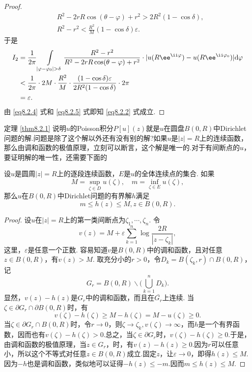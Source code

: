 \begin{proof}
\begin{align*}
&R^2-2rR\cos(\theta-\varphi)+r^2>2R^2(1-\cos\delta),\\
&R^2-r^2<\frac{R^2}M(1-\cos\delta)\varepsilon.
\end{align*}
于是
\begin{equation}\label{eq8.2.5}
\begin{aligned}
I_2&=\frac1{2\pi}\int\limits_{|\varphi-\varphi_0|>\delta}\frac{R^2-r^2}{R^2-2rR
\cos(\theta-\varphi)+r^2}\cdot|u(R\ee^{\ii\varphi})-u(R\ee^{\ii\varphi_0})|\textrm d\varphi\\
&<\frac1{2\pi}\cdot2M\cdot\frac{R^2}M\cdot\frac{(1-\cos\delta)\varepsilon}
{2R^2(1-\cos\delta)}\cdot2\pi\\
&=\varepsilon.
\end{aligned}
\end{equation}
由 \eqref{eq8.2.4} 式和 \eqref{eq8.2.5} 式即知 \eqref{eq8.2.2} 式成立.
\end{proof}

定理 \ref{thm8.2.1} 说明$u$的Poisson积分$P[u](z)$就是$u$在圆盘$B(0,R)$中Dirichlet问题的解.问题是除了这个解以外还有没有别的解?如果$u$是$|z|=R$上的连续函数，那么由调和函数的极值原理，立刻可以断言，这个解是唯一的.对于有间断点的$u$，要证明解的唯一性，还需要下面的
\begin{prop}\label{prop8.2.2}
设$u$是圆周$|z|=R$上的逐段连续函数，$E$是$u$的全体连续点的集合. 如果
\[M=\sup_{\zeta\in D}u(\zeta),\quad m=\inf_{\zeta\in E}u(\zeta),\]
那么$u$在$B(0,R)$中Dirichlet问题的有界解$h$满足
\[m\le h(z)\le M,z\in B(0,R).\]
\end{prop}
\begin{proof}
设$u$在$|z|=R$上的第一类间断点为$\zeta_1,\cdots,\zeta_n$. 令
\[v(z)=M+\varepsilon\sum_{k=1}^n\log\frac{2R}{|z-\zeta_k|},\]
这里，$\varepsilon$是任意一个正数. 容易知道$v$是$B(0,R)$中的调和函数，且对任意$z\in B(0,R)$，有$v(z)>M$. 取充分小的$r>0$，令$D_k=B(\zeta_k,r)\cap B(0,R)$，记
\[G_r=B(0,R)\backslash\big(\bigcup_{k=1}^nD_k\big).\]
显然，$v(z)-h(z)$是$G_r$中的调和函数，而且在$\bar{G_r}$上连续. 当$\zeta\in\partial G_r\cap\partial B(0,R)$时，有
\[v(\zeta)-h(\zeta)\ge M-h(\zeta)=M-u(\zeta)\ge0.\]
当$\zeta\in\partial G_r\cap B(0,R)$时，令$r\to0$，则$\zeta\to \zeta_k,v(\zeta)\to\infty$，而$h$是一个有界函数，因而也有$v(\zeta)-h(\zeta)>0$.总之，当$\zeta\in\partial G_r$时，$v(\zeta)-h(\zeta)\ge0$.于是，由调和函数的极值原理，当$z\in G_r$，时，有$v(z)-h(z)\ge0$.因为$r$可以任意小，所以这个不等式对任意$z\in B(0,R)$成立.固定$z$，让$\varepsilon\to0$，即得$h(z)\le M$.因为$-h$也是调和函数，类似地可以证得$-h(z)\le -m$.因而$m\le h(z)\le M$.
\end{proof}

